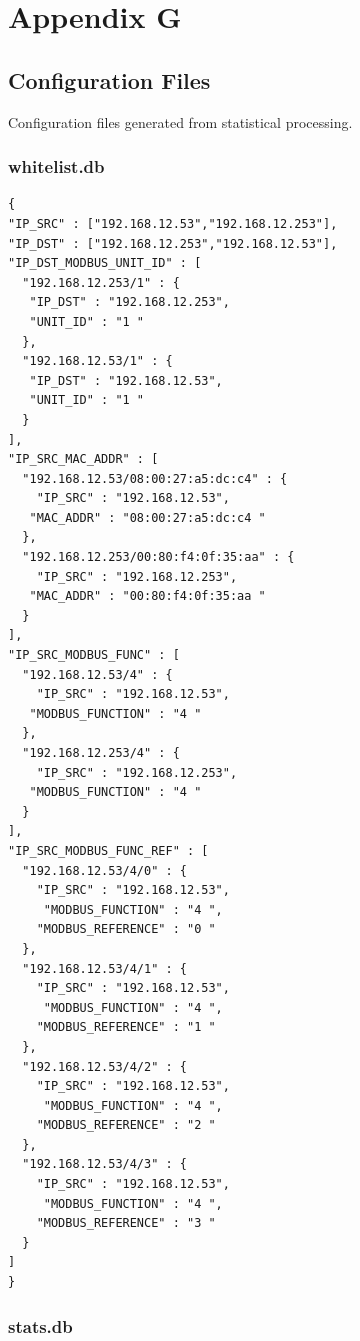 \documentclass[11pt,]{article}
\begin{document}
\newpage

\section*{Appendix G}\label{appendix-g}

\subsection*{Configuration Files}\label{configuration-files}

Configuration files generated from statistical processing.

\subsubsection*{whitelist.db}\label{whitelist.db}

\begin{verbatim}
{
"IP_SRC" : ["192.168.12.53","192.168.12.253"],
"IP_DST" : ["192.168.12.253","192.168.12.53"],
"IP_DST_MODBUS_UNIT_ID" : [
  "192.168.12.253/1" : {
   "IP_DST" : "192.168.12.253",
   "UNIT_ID" : "1 "
  },
  "192.168.12.53/1" : {
   "IP_DST" : "192.168.12.53",
   "UNIT_ID" : "1 "
  }
],
"IP_SRC_MAC_ADDR" : [
  "192.168.12.53/08:00:27:a5:dc:c4" : {
    "IP_SRC" : "192.168.12.53",
   "MAC_ADDR" : "08:00:27:a5:dc:c4 "
  },
  "192.168.12.253/00:80:f4:0f:35:aa" : {
    "IP_SRC" : "192.168.12.253",
   "MAC_ADDR" : "00:80:f4:0f:35:aa "
  }
],
"IP_SRC_MODBUS_FUNC" : [
  "192.168.12.53/4" : {
    "IP_SRC" : "192.168.12.53",
   "MODBUS_FUNCTION" : "4 "
  },
  "192.168.12.253/4" : {
    "IP_SRC" : "192.168.12.253",
   "MODBUS_FUNCTION" : "4 "
  }
],
"IP_SRC_MODBUS_FUNC_REF" : [
  "192.168.12.53/4/0" : {
    "IP_SRC" : "192.168.12.53",
     "MODBUS_FUNCTION" : "4 ",
    "MODBUS_REFERENCE" : "0 "
  },
  "192.168.12.53/4/1" : {
    "IP_SRC" : "192.168.12.53",
     "MODBUS_FUNCTION" : "4 ",
    "MODBUS_REFERENCE" : "1 "
  },
  "192.168.12.53/4/2" : {
    "IP_SRC" : "192.168.12.53",
     "MODBUS_FUNCTION" : "4 ",
    "MODBUS_REFERENCE" : "2 "
  },
  "192.168.12.53/4/3" : {
    "IP_SRC" : "192.168.12.53",
     "MODBUS_FUNCTION" : "4 ",
    "MODBUS_REFERENCE" : "3 "
  }
]
}
\end{verbatim}

\newpage

\subsubsection*{stats.db}\label{stats.db}
\end{document}
